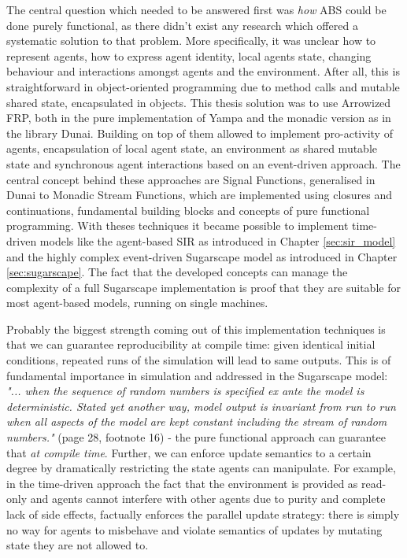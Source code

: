 The central question which needed to be answered first was \textit{how} ABS could be done purely functional, as there didn't exist any research which offered a systematic solution to that problem. More specifically, it was unclear how to represent agents, how to express agent identity, local agents state, changing behaviour and interactions amongst agents and the environment. After all, this is straightforward in object-oriented programming due to method calls and mutable shared state, encapsulated in objects. This thesis solution was to use Arrowized FRP, both in the pure implementation of Yampa and the monadic version as in the library Dunai. Building on top of them allowed to implement pro-activity of agents, encapsulation of local agent state, an environment as shared mutable state and synchronous agent interactions based on an event-driven approach. The central concept behind these approaches are Signal Functions, generalised in Dunai to Monadic Stream Functions, which are implemented using closures and continuations, fundamental building blocks and concepts of pure functional programming. With theses techniques it became possible to implement time-driven models like the agent-based SIR as introduced in Chapter \ref{sec:sir_model} and the highly complex event-driven Sugarscape model as introduced in Chapter \ref{sec:sugarscape}. The fact that the developed concepts can manage the complexity of a full Sugarscape implementation is proof that they are suitable for most agent-based models, running on single machines. 

Probably the biggest strength coming out of this implementation techniques is that we can guarantee reproducibility at compile time: given identical initial conditions, repeated runs of the simulation will lead to same outputs. This is of fundamental importance in simulation and addressed in the Sugarscape model: \textit{"... when the sequence of random numbers is specified ex ante the model is deterministic. Stated yet another way, model output is invariant from run to run when all aspects of the model are kept constant including the stream of random numbers."} (page 28, footnote 16) - the pure functional approach can guarantee that \textit{at compile time}. Further, we can enforce update semantics to a certain degree by dramatically restricting the state agents can manipulate. For example, in the time-driven approach the fact that the environment is provided as read-only and agents cannot interfere with other agents due to purity and complete lack of side effects, factually enforces the parallel update strategy: there is simply no way for agents to misbehave and violate semantics of updates by mutating state they are not allowed to.

